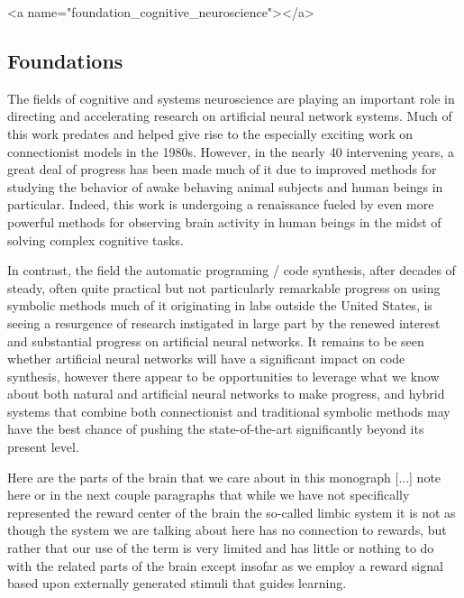 
\rawhtml
<a name="foundation_cognitive_neuroscience"></a>
\endrawhtml
\subsection*{Foundations}


The fields of cognitive and systems neuroscience are playing an important role in directing and accelerating research on artificial neural network systems. Much of this work predates and helped give rise to the especially exciting work on connectionist models in the 1980s. However, in the nearly 40 intervening years, a great deal of progress has been made much of it due to improved methods for studying the behavior of awake behaving animal subjects and human beings in particular. Indeed, this work is undergoing a renaissance fueled by even more powerful methods for observing brain activity in human beings in the midst of solving complex cognitive tasks.

In contrast, the field the automatic programing / code synthesis, after decades of steady, often quite practical but not particularly remarkable progress on using symbolic methods \emdash{} much of it originating in labs outside the United States, is seeing a resurgence of research instigated in large part by the renewed interest and substantial progress on artificial neural networks. It remains to be seen whether artificial neural networks will have a significant impact on code synthesis, however there appear to be opportunities to leverage what we know about both natural and artificial neural networks to make progress, and hybrid systems that combine both connectionist and traditional symbolic methods may have the best chance of pushing the state-of-the-art significantly beyond its present level.


Here are the parts of the brain that we care about in this monograph [...] note here or in the next couple paragraphs that while we have not specifically represented the reward center of the brain \emdash{} the so-called limbic system \emdash{} it is not as though the system we are talking about here has no connection to rewards, but rather that our use of the term is very limited and has little or nothing to do with the related parts of the brain except insofar as we employ a reward signal based upon externally generated stimuli that guides learning.

